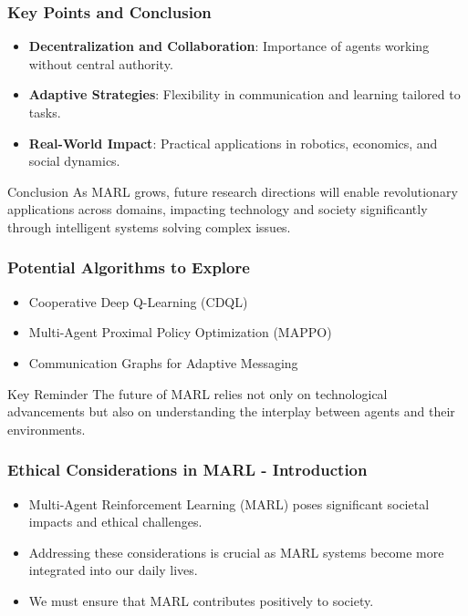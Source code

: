 \documentclass[aspectratio=169]{beamer}
\begin{document}
\begin{frame}[fragile]
    \frametitle{Key Points and Conclusion}
    \begin{itemize}
        \item \textbf{Decentralization and Collaboration}: Importance of agents working without central authority.
        \item \textbf{Adaptive Strategies}: Flexibility in communication and learning tailored to tasks.
        \item \textbf{Real-World Impact}: Practical applications in robotics, economics, and social dynamics.
    \end{itemize}

    \begin{block}{Conclusion}
        As MARL grows, future research directions will enable revolutionary applications across domains, impacting technology and society significantly through intelligent systems solving complex issues.
    \end{block}
\end{frame}

\begin{frame}[fragile]
    \frametitle{Potential Algorithms to Explore}
    \begin{itemize}
        \item Cooperative Deep Q-Learning (CDQL)
        \item Multi-Agent Proximal Policy Optimization (MAPPO)
        \item Communication Graphs for Adaptive Messaging
    \end{itemize}
    \begin{block}{Key Reminder}
        The future of MARL relies not only on technological advancements but also on understanding the interplay between agents and their environments.
    \end{block}
\end{frame}

\begin{frame}[fragile]
  \frametitle{Ethical Considerations in MARL - Introduction}
  \begin{itemize}
    \item Multi-Agent Reinforcement Learning (MARL) poses significant societal impacts and ethical challenges.
    \item Addressing these considerations is crucial as MARL systems become more integrated into our daily lives.
    \item We must ensure that MARL contributes positively to society.
  \end{itemize}
\end{frame}
\end{document}
